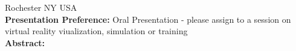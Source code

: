 \documentclass[]{spie}  %
\begin{document}
Rochester NY USA \\
\skiplinehalf
%
{\bf Presentation Preference:}
\skiplinehalf
Oral Presentation - please assign to a session on virtual reality viualization, simulation or training\\
\skiplinehalf
%
%
{\bf Abstract:}
\end{document}
